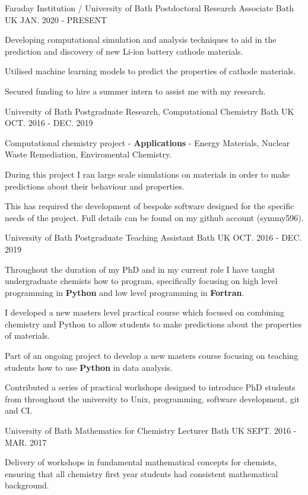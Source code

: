 \begin{cventries}
	\cventry
	{Faraday Institution / University of Bath}
	{Postdoctoral Research Associate}
	{Bath UK}
	{JAN. 2020 - PRESENT}
	{
		\begin{cvitems}
			\item {Developing computational simulation and analysis techniques to aid in the prediction and discovery of new Li-ion battery cathode materials.}
			\item {Utilised machine learning models to predict the properties of cathode materials.}
			\item {Secured funding to hire a summer intern to assist me with my research.}
		\end{cvitems}
	}
	\cventry
	{University of Bath}
	{Postgraduate Research, Computational Chemistry}
	{Bath UK}
	{OCT. 2016 - DEC. 2019}
	{
		\begin{cvitems}
			\item {Computational chemistry project - \textbf{Applications} - Energy Materials, Nuclear Waste Remediation, Enviromental Chemistry.}
			\item {During this project I ran large scale simulations on materials in order to make predictions about their behaviour and properties.}
			\item {This has required the development of bespoke software designed for the specific needs of the project. Full details can be found on my github account (symmy596).}
		\end{cvitems}
	}
	\cventry
	{University of Bath}
	{Postgraduate Teaching Assistant}
	{Bath UK}
	{OCT. 2016 - DEC. 2019}
	{
		\begin{cvitems}
			\item {Throughout the duration of my PhD and in my current role I have taught undergraduate chemists how to program, specifically focusing on high level programming
			in \textbf{Python} and low level programming in \textbf{Fortran}.}
			\item {I developed a new masters level practical course which focused on combining chemistry and Python to allow students to make predictions about the properties of materials.}
			\item {Part of an ongoing project to develop a new masters course focusing on teaching students how to use \textbf{Python} in data analysis.}
			\item {Contributed a series of practical workshops designed to introduce PhD students from throughout the university to Unix, programming, software development, git and CI.}
		\end{cvitems}
	}
	\cventry
	{University of Bath}
	{Mathematics for Chemistry Lecturer}
	{Bath UK}
	{SEPT. 2016 - MAR. 2017}
	{
		\begin{cvitems}
			\item {Delivery of workshops in fundamental mathematical concepts for chemists, ensuring that all chemistry first year students had consistent mathematical background.}
		\end{cvitems}
	}
\end{cventries}


